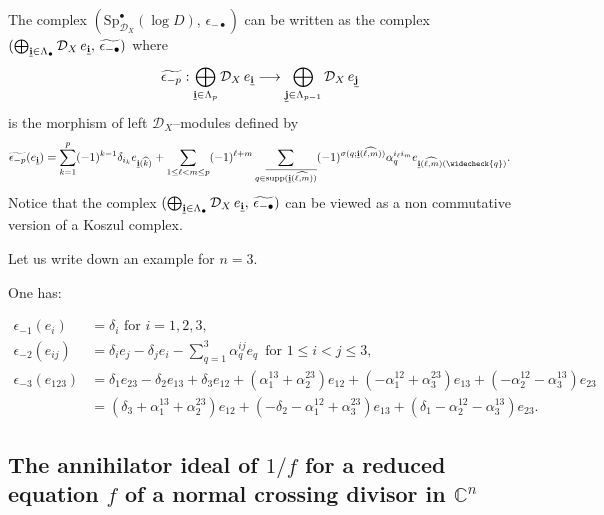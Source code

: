 \documentclass[12pt]{article}
\newcommand{\CC}{\mathbb{C}}
\newcommand{\ubi}{{\underline{{\bf i}}}}
\newcommand{\ubj}{{\underline{{\bf j}}}}
\newcommand{\DD}{\mathcal{D}}
\newcommand{\Sp}{{\mathrm{Sp}}}
\newcommand{\cD}{\DD}
\DeclareMathOperator{\supp}{\rm supp}
\begin{document}
The complex $(\Sp^\bullet_{\cD_X}(\log D),\, \epsilon_{-\bullet})$ can be written as the complex $(\bigoplus_{\ubi \in \Lambda_\bullet} \cD_X \,e_\ubi,\, \widetilde{\epsilon_{-\bullet}})$ where
$$\widetilde{\epsilon_{-p}} : \bigoplus_{\ubi \in \Lambda_p} \cD_X \,e_\ubi \longrightarrow \bigoplus_{\ubj \in \Lambda_{p-1}} \cD_X \,e_\ubj$$ is the morphism of left $\cD_X$--modules defined by
$$\widetilde{\epsilon_{-p}} (e_\ubi) = \sum_{k=1}^p (-1)^{k-1} \delta_{i_k} e_{\ubi(\widehat{k})} + \sum_{1\leq \ell < m \leq p} (-1)^{\ell + m} \sum_{q \in \overline{\supp(\ubi(\widehat{\ell, m}))}} (-1)^{\sigma(q; \ubi(\widehat{\ell, m}))}\alpha^{i_\ell i_m}_q e_{\ubi(\widehat{\ell,m})(\widecheck{q})}.$$
Notice that the complex $(\bigoplus_{\ubi \in \Lambda_\bullet} \cD_X \,e_\ubi,\, \widetilde{\epsilon_{-\bullet}})$ can be viewed as a non commutative version of a Koszul complex.

Let us write down an example for $n=3$.

One has:

\begin{equation*}
\begin{split}
\epsilon_{-1}(e_i) & =\delta_i {\mbox{ for }} i=1,2,3, \\
\epsilon_{-2}(e_{ij}) & = \delta_i e_j - \delta_j e_i - \sum_{q=1}^3 \alpha_q^{ij} e_q \, {\mbox { for }}  1\leq i <j \leq 3, \\
\epsilon_{-3}(e_{123}) & = \delta_1 e_{23} - \delta_2 e_{13} + \delta_3 e_{12} + (\alpha_1^{13}+\alpha_2^{23}) e_{12} + (-\alpha_1^{12} + \alpha_3^{23})e_{13} + (-\alpha_2^{12} - \alpha_3^{13})e_{23} \\ & = (\delta_3+ \alpha_1^{13}+\alpha_2^{23}) e_{12} + (-\delta_2 -\alpha_1^{12} + \alpha_3^{23}) e_{13} + (\delta_1-\alpha_2^{12} - \alpha_3^{13}) e_{23}.
\end{split}
\end{equation*}


\subsection{The annihilator ideal of $1/f$ for a reduced equation $f$ of a normal crossing divisor in $\CC^n$}
\end{document}
